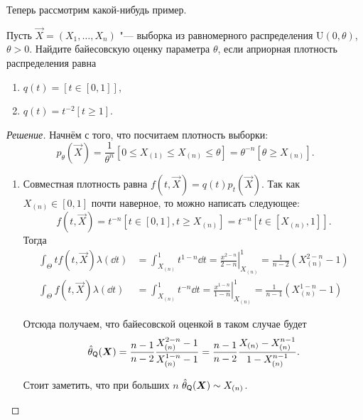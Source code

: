 Теперь рассмотрим какой-нибудь пример.
\begin{problem}
    Пусть $\vec{X} = (X_{1}, \ldots, X_{n})$ "--- выборка из равномерного распределения $\mathrm{U}(0, \theta)$, $\theta > 0$. Найдите байесовскую оценку параметра $\theta$, если априорная плотность распределения равна
    \begin{enumerate}[label=(\alph*)]
        \item $q(t) = [t \in [0, 1]]$,
        \item $q(t) = t^{-2}[t \geq 1]$.
    \end{enumerate}
\end{problem}
\begin{proof}[Решение]
    Начнём с того, что посчитаем плотность выборки:
    \[
        p_{\theta}(\vec{X}) = \frac{1}{\theta^{n}}[0 \leq X_{(1)} \leq X_{(n)} \leq \theta] = \theta^{-n}[\theta \geq X_{(n)}].
    \]
    
    \begin{enumerate}[label=(\alph*)]
        \item Совместная плотность равна $f(t, \vec{X}) = q(t)p_{t}(\vec{X})$. Так как $X_{(n)} \in [0, 1]$ почти наверное, то можно написать следующее:
        \[
            f(t, \vec{X}) = t^{-n}[t \in [0, 1], t \geq X_{(n)}] = t^{-n}[t \in [X_{(n)}, 1]].
        \]
        Тогда
        \begin{align*}
            \int_{\Theta} tf(t, \vec{X})\lambda(\dd t)
            &= \int_{X_{(n)}}^{1} t^{1 - n}\dd t
            = \left.\frac{x^{2 - n}}{2 - n}\right|_{X_{(n)}}^{1}
            = \frac{1}{n - 2}(X_{(n)}^{2 - n} - 1) \\
            \int_{\Theta} f(t, \vec{X})\lambda(\dd t)
            &= \int_{X_{(n)}}^{1} t^{-n}\dd t
            = \left.\frac{x^{1 - n}}{1 - n}\right|_{X_{(n)}}^{1}
            = \frac{1}{n - 1}(X_{(n)}^{1 - n} - 1)
        \end{align*}
        
        Отсюда получаем, что байесовской оценкой в таком случае будет
        \[
            \hat{\theta}_{\mathsf{Q}}(\bm{X}) 
            = \frac{n - 1}{n - 2}\frac{X_{(n)}^{2 - n} - 1}{X_{(n)}^{1 - n} - 1}
            = \frac{n - 1}{n - 2}\frac{X_{(n)} - X_{(n)}^{n - 1}}{1 - X_{(n)}^{n - 1}}.
        \]
        
        Стоит заметить, что при больших $n$ $\hat{\theta}_{\mathsf{Q}}(\bm{X}) \sim X_{(n)}$.
        

\end{enumerate}
\end{proof}
